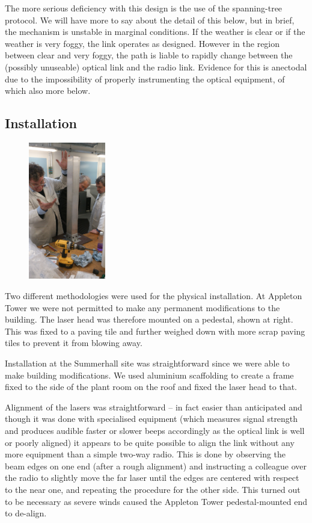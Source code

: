 The more serious deficiency with this design is the use of the
spanning-tree protocol. We will have more to say about the detail of
this below, but in brief, the mechanism is unstable in marginal
conditions. If the weather is clear or if the weather is very foggy,
the link operates as designed. However in the region between clear and
very foggy, the path is liable to rapidly change between the (possibly
unuseable) optical link and the radio link. Evidence for this is
anectodal due to the impossibility of properly instrumenting the
optical equipment, of which also more below.
\clearpage

\subsection{Installation}
\label{sec:fittings}

\begin{figure}
  \includegraphics[angle=-90,width=0.3\textwidth]{tada}
\end{figure}
Two different methodologies were used for the physical
installation. At Appleton Tower we were not permitted to make any
permanent modifications to the building. The laser head was therefore
mounted on a pedestal, shown at right. This was fixed to a paving tile
and further weighed down with more scrap paving tiles to prevent it
from blowing away.

Installation at the Summerhall site was straightforward since we were
able to make building modifications. We used aluminium scaffolding to
create a frame fixed to the side of the plant room on the roof and
fixed the laser head to that.

Alignment of the lasers was straightforward -- in fact easier than
anticipated and though it was done with specialised equipment (which
measures signal strength and produces audible faster or slower beeps
accordingly as the optical link is well or poorly aligned) it appears
to be quite possible to align the link without any more equipment than
a simple two-way radio. This is done by observing the beam edges on
one end (after a rough alignment) and instructing a colleague over the
radio to slightly move the far laser until the edges are centered with
respect to the near one, and repeating the procedure for the other
side. This turned out to be necessary as severe winds caused the
Appleton Tower pedestal-mounted end to de-align.


